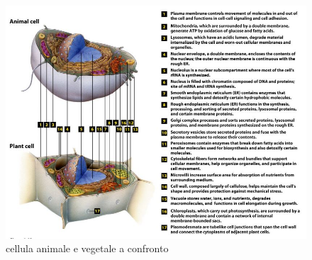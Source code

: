   \begin{figure}[h]
            \centering
            \includegraphics[width=1\textwidth]{images/schemagenerale.JPG}
            \caption{\small cellula animale e vegetale a confronto}
            \label{fig:mesh1}
        \end{figure}

